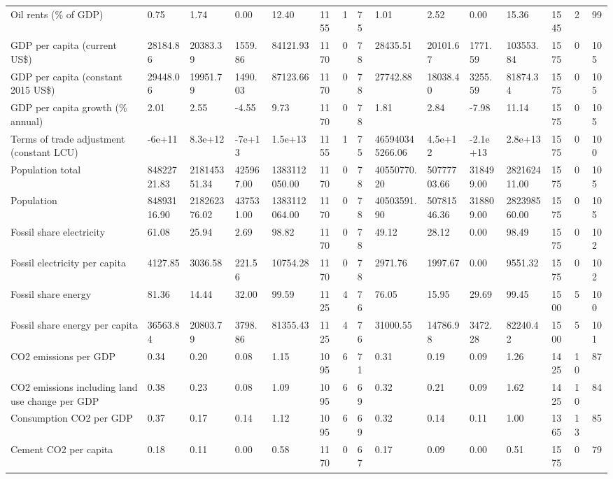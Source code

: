 \begin{longtable}{lllllllllllllll}
Oil rents (\% of GDP) & 0.75 & 1.74 & 0.00 & 12.40 & 1155 & 1 & 75 & 1.01 & 2.52 & 0.00 & 15.36 & 1545 & 2 & 99\\
GDP per capita (current US\$) & 28184.86 & 20383.39 & 1559.86 & 84121.93 & 1170 & 0 & 78 & 28435.51 & 20101.67 & 1771.59 & 103553.84 & 1575 & 0 & 105\\
GDP per capita (constant 2015 US\$) & 29448.06 & 19951.79 & 1490.03 & 87123.66 & 1170 & 0 & 78 & 27742.88 & 18038.40 & 3255.59 & 81874.34 & 1575 & 0 & 105\\
GDP per capita growth (\% annual) & 2.01 & 2.55 & -4.55 & 9.73 & 1170 & 0 & 78 & 1.81 & 2.84 & -7.98 & 11.14 & 1575 & 0 & 105\\
\addlinespace
Terms of trade adjustment (constant LCU) & -6e+11 & 8.3e+12 & -7e+13 & 1.5e+13 & 1155 & 1 & 75 & 465940345266.06 & 4.5e+12 & -2.1e+13 & 2.8e+13 & 1575 & 0 & 100\\
Population total & 84822721.83 & 218145351.34 & 425967.00 & 1383112050.00 & 1170 & 0 & 78 & 40550770.20 & 50777703.66 & 318499.00 & 282162411.00 & 1575 & 0 & 105\\
Population & 84893116.90 & 218262376.02 & 437531.00 & 1383112064.00 & 1170 & 0 & 78 & 40503591.90 & 50781546.36 & 318809.00 & 282398560.00 & 1575 & 0 & 105\\
Fossil share electricity & 61.08 & 25.94 & 2.69 & 98.82 & 1170 & 0 & 78 & 49.12 & 28.12 & 0.00 & 98.49 & 1575 & 0 & 102\\
Fossil electricity per capita & 4127.85 & 3036.58 & 221.56 & 10754.28 & 1170 & 0 & 78 & 2971.76 & 1997.67 & 0.00 & 9551.32 & 1575 & 0 & 102\\
\addlinespace
Fossil share energy & 81.36 & 14.44 & 32.00 & 99.59 & 1125 & 4 & 76 & 76.05 & 15.95 & 29.69 & 99.45 & 1500 & 5 & 100\\
Fossil share energy per capita & 36563.84 & 20803.79 & 3798.86 & 81355.43 & 1125 & 4 & 76 & 31000.55 & 14786.98 & 3472.28 & 82240.42 & 1500 & 5 & 101\\
CO2 emissions per GDP & 0.34 & 0.20 & 0.08 & 1.15 & 1095 & 6 & 71 & 0.31 & 0.19 & 0.09 & 1.26 & 1425 & 10 & 87\\
CO2 emissions including land use change per GDP & 0.38 & 0.23 & 0.08 & 1.09 & 1095 & 6 & 69 & 0.32 & 0.21 & 0.09 & 1.62 & 1425 & 10 & 84\\
Consumption CO2 per GDP & 0.37 & 0.17 & 0.14 & 1.12 & 1095 & 6 & 69 & 0.32 & 0.14 & 0.11 & 1.00 & 1365 & 13 & 85\\
\addlinespace
Cement CO2 per capita & 0.18 & 0.11 & 0.00 & 0.58 & 1170 & 0 & 67 & 0.17 & 0.09 & 0.00 & 0.51 & 1575 & 0 & 79\\

\end{longtable}
